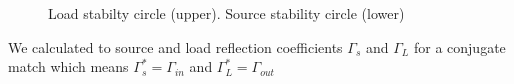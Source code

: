 \documentclass{article}
\begin{document}
\begin{multicols}{2}
\begin{figure}[H]
  \caption{Load stabilty circle (upper). Source stability circle (lower)}
  \label{fig4}
\end{figure}
We calculated to source and load reflection coefficients $\Gamma_s$ and $\Gamma_L$
for a conjugate match which means $\Gamma_s^* = \Gamma_{in}$ and $\Gamma_L^*= \Gamma_{out}$



\end{multicols}
\end{document}
